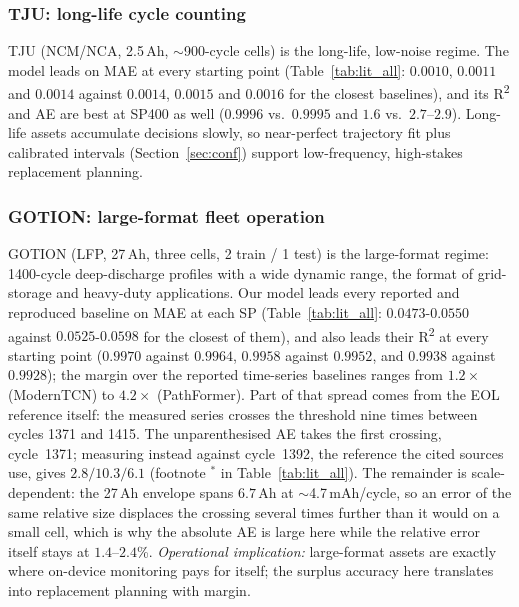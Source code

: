 \documentclass[final,5p,times,twocolumn]{elsarticle}
\begin{document}
\subsubsection{TJU: long-life cycle counting}
TJU (NCM/NCA, 2.5\,Ah, $\sim$900-cycle cells) is the long-life,
low-noise regime. The model leads on MAE at every starting point
(Table~\ref{tab:lit_all}: $0.0010$, $0.0011$ and $0.0014$ against
$0.0014$, $0.0015$ and $0.0016$ for the closest baselines), and its
R\textsuperscript{2} and AE are best at SP400 as well ($0.9996$ vs.\
$0.9995$ and $1.6$ vs.\ $2.7$--$2.9$).
Long-life assets accumulate decisions slowly, so near-perfect
trajectory fit plus calibrated intervals (Section~\ref{sec:conf})
support low-frequency, high-stakes replacement planning.





\subsubsection{GOTION: large-format fleet operation}
GOTION (LFP, 27\,Ah, three cells, 2 train / 1 test) is the
large-format regime: 1400-cycle deep-discharge profiles with a wide
dynamic range, the format of grid-storage and heavy-duty
applications. Our
model leads every reported and reproduced baseline on MAE at each SP
(Table~\ref{tab:lit_all}: $0.0473$-$0.0550$ against $0.0525$-$0.0598$
for the closest of them), and also leads their R\textsuperscript{2} at every
starting point ($0.9970$ against $0.9964$, $0.9958$ against $0.9952$, and
$0.9938$ against $0.9928$); the margin over the reported
time-series baselines ranges from $1.2\times$ (ModernTCN) to
$4.2\times$ (PathFormer). Part of that spread comes from the EOL reference
itself: the measured series crosses the threshold nine times between cycles
1371 and 1415. The unparenthesised AE takes the first crossing, cycle~1371;
measuring instead against cycle~1392, the reference the cited
sources use, gives $2.8/10.3/6.1$ (footnote
$^{\ast}$ in Table~\ref{tab:lit_all}). The remainder is scale-dependent:
the 27\,Ah envelope spans
$6.7$\,Ah at $\sim$4.7\,mAh/cycle, so an error of the same relative size
displaces the crossing several times further than it would on a small cell,
which is why the absolute AE is large here while the relative error itself
stays at $1.4$--$2.4$\%. \emph{Operational implication:} large-format assets
are exactly where on-device monitoring pays for itself; the surplus
accuracy here translates into replacement planning with margin.
\end{document}
